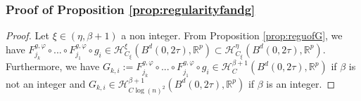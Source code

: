 \documentclass[10pt]{article}
\begin{document}
\subsubsection{Proof of Proposition \ref{prop:regularityfandg}}\label{sec:prop:regularityfandg}
\begin{proof}
     Let $\xi\in (\eta,\beta+1)$ a non integer. From Proposition \ref{prop:reguofG}, we have $F^{g,\varphi}_{j_k}\circ...\circ F^{g,\varphi}_{j_1} \circ g_{i}\in \mathcal{H}^{\xi}_{C_\xi}(B^d(0,2\tau),\mathbb{R}^p) \subset \mathcal{H}^{\eta}_{C_\xi}(B^d(0,2\tau),\mathbb{R}^p)$. Furthermore, we have $G_{k,i}:=F^{g,\varphi}_{j_k}\circ...\circ F^{g,\varphi}_{j_1} \circ g_{i}\in \mathcal{H}^{\beta+1}_C(B^d(0,2\tau),\mathbb{R}^p)$ if $\beta$ is not an integer and $G_{k,i}\in \mathcal{H}^{\beta+1}_{C\log(n)^2}(B^d(0,2\tau),\mathbb{R}^p)$ if $\beta$ is an integer.
\end{proof}
\end{document}
